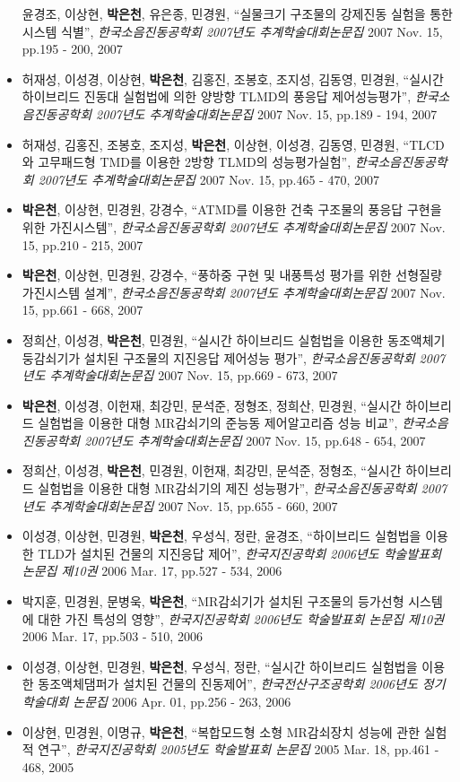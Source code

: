 \begin{itemize}
  윤경조, 이상현, \textbf{박은천}, 유은종, 민경원, ``실물크기 구조물의
  강제진동 실험을 통한 시스템 식별'', \emph{한국소음진동공학회 2007년도
  추계학술대회논문집} 2007 Nov. 15, pp.195 - 200, 2007
\item
  허재성, 이성경, 이상현, \textbf{박은천}, 김홍진, 조봉호, 조지성,
  김동영, 민경원, ``실시간 하이브리드 진동대 실험법에 의한 양방향 TLMD의
  풍응답 제어성능평가'', \emph{한국소음진동공학회 2007년도
  추계학술대회논문집} 2007 Nov. 15, pp.189 - 194, 2007
\item
  허재성, 김홍진, 조봉호, 조지성, \textbf{박은천}, 이상현, 이성경,
  김동영, 민경원, ``TLCD와 고무패드형 TMD를 이용한 2방향 TLMD의
  성능평가실험'', \emph{한국소음진동공학회 2007년도 추계학술대회논문집}
  2007 Nov. 15, pp.465 - 470, 2007
\item
  \textbf{박은천}, 이상현, 민경원, 강경수, ``ATMD를 이용한 건축 구조물의
  풍응답 구현을 위한 가진시스템'', \emph{한국소음진동공학회 2007년도
  추계학술대회논문집} 2007 Nov. 15, pp.210 - 215, 2007
\item
  \textbf{박은천}, 이상현, 민경원, 강경수, ``풍하중 구현 및 내풍특성
  평가를 위한 선형질량 가진시스템 설계'', \emph{한국소음진동공학회
  2007년도 추계학술대회논문집} 2007 Nov. 15, pp.661 - 668, 2007
\item
  정희산, 이성경, \textbf{박은천}, 민경원, ``실시간 하이브리드 실험법을
  이용한 동조액체기둥감쇠기가 설치된 구조물의 지진응답 제어성능 평가'',
  \emph{한국소음진동공학회 2007년도 추계학술대회논문집} 2007 Nov. 15,
  pp.669 - 673, 2007
\item
  \textbf{박은천}, 이성경, 이헌재, 최강민, 문석준, 정형조, 정희산,
  민경원, ``실시간 하이브리드 실험법을 이용한 대형 MR감쇠기의 준능동
  제어알고리즘 성능 비교'', \emph{한국소음진동공학회 2007년도
  추계학술대회논문집} 2007 Nov. 15, pp.648 - 654, 2007
\item
  정희산, 이성경, \textbf{박은천}, 민경원, 이헌재, 최강민, 문석준,
  정형조, ``실시간 하이브리드 실험법을 이용한 대형 MR감쇠기의 제진
  성능평가'', \emph{한국소음진동공학회 2007년도 추계학술대회논문집} 2007
  Nov. 15, pp.655 - 660, 2007
\item
  이성경, 이상현, 민경원, \textbf{박은천}, 우성식, 정란, 윤경조,
  ``하이브리드 실험법을 이용한 TLD가 설치된 건물의 지진응답 제어'',
  \emph{한국지진공학회 2006년도 학술발표회 논문집 제10권} 2006 Mar. 17,
  pp.527 - 534, 2006
\item
  박지훈, 민경원, 문병욱, \textbf{박은천}, ``MR감쇠기가 설치된 구조물의
  등가선형 시스템에 대한 가진 특성의 영향'', \emph{한국지진공학회
  2006년도 학술발표회 논문집 제10권} 2006 Mar. 17, pp.503 - 510, 2006
\item
  이성경, 이상현, 민경원, \textbf{박은천}, 우성식, 정란, ``실시간
  하이브리드 실험법을 이용한 동조액체댐퍼가 설치된 건물의 진동제어'',
  \emph{한국전산구조공학회 2006년도 정기 학술대회 논문집} 2006 Apr. 01,
  pp.256 - 263, 2006
\item
  이상현, 민경원, 이명규, \textbf{박은천}, ``복합모드형 소형 MR감쇠장치
  성능에 관한 실험적 연구'', \emph{한국지진공학회 2005년도 학술발표회
  논문집} 2005 Mar. 18, pp.461 - 468, 2005
\end{itemize}

